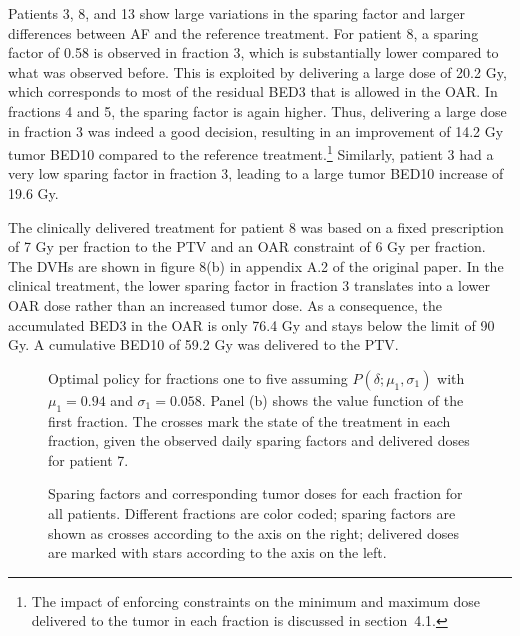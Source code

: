 \documentclass[11pt]{article}
\begin{document}
Patients 3, 8, and 13 show large variations in the sparing factor and larger differences between AF and the reference treatment. For patient 8, a sparing factor of 0.58 is observed in fraction 3, which is substantially lower compared to what was observed before. This is exploited by delivering a large dose of 20.2 Gy, which corresponds to most of the residual BED3 that is allowed in the OAR. In fractions 4 and 5, the sparing factor is again higher. Thus, delivering a large dose in fraction 3 was indeed a good decision, resulting in an improvement of 14.2 Gy tumor BED10 compared to the reference treatment.\footnote{The impact of enforcing constraints on the minimum and maximum dose delivered to the tumor in each fraction is discussed in section~4.1.} Similarly, patient 3 had a very low sparing factor in fraction 3, leading to a large tumor BED10 increase of 19.6 Gy.

The clinically delivered treatment for patient 8 was based on a fixed prescription of 7 Gy per fraction to the PTV and an OAR constraint of 6 Gy per fraction. The DVHs are shown in figure 8(b) in appendix A.2 of the original paper. In the clinical treatment, the lower sparing factor in fraction 3 translates into a lower OAR dose rather than an increased tumor dose. As a consequence, the accumulated BED3 in the OAR is only 76.4 Gy and stays below the limit of 90 Gy. A cumulative BED10 of 59.2 Gy was delivered to the PTV.

\begin{figure}[ht]
\centering
{}
\caption{Optimal policy for fractions one to five assuming $P(\delta; \mu_1, \sigma_1)$ with $\mu_1 = 0.94$ and $\sigma_1 = 0.058$. Panel (b) shows the value function of the first fraction. The crosses mark the state of the treatment in each fraction, given the observed daily sparing factors and delivered doses for patient 7.}
\label{fig:policy-patient7}
\end{figure}

\begin{figure}[ht]
\centering
{}
\caption{Sparing factors and corresponding tumor doses for each fraction for all patients. Different fractions are color coded; sparing factors are shown as crosses according to the axis on the right; delivered doses are marked with stars according to the axis on the left.}
\label{fig:all-patient-doses}
\end{figure}
\end{document}
